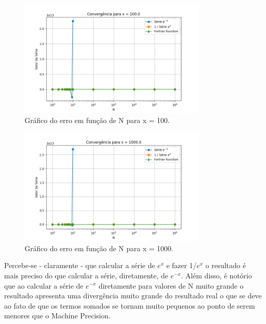 \documentclass[12pt, a4paper]{article} %
\begin{document}
\begin{figure}[H]
    \centering
    \includegraphics[width=0.8\textwidth]{../images/grafico_x_100.0.png}
    \caption{Gr\'afico do erro em fun\c{c}\~ao de N para x = 100.}
\end{figure}

\begin{figure}[H]
    \centering
    \includegraphics[width=0.8\textwidth]{../images/grafico_x_1000.0.png}
    \caption{Gr\'afico do erro em fun\c{c}\~ao de N para x = 1000.}
\end{figure}

Percebe-se - claramente - que calcular a s\'erie de $e^x$ e fazer 1/$e^x$ o resultado \'e mais preciso do que calcular a s\'erie, diretamente, de $e^{-x}$. Al\'em disso, \'e not\'orio que ao calcular a s\'erie de $e^{-x}$  diretamente para valores de N muito grande o resultado apresenta uma diverg\^encia muito grande do resultado real o que se deve ao fato de que os termos somados se tornam muito pequenos ao ponto de serem menores que o Machine Precision.
\end{document}
